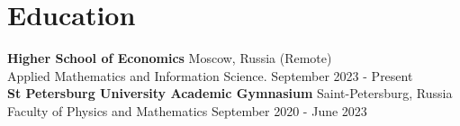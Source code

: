 \section{\sc Education}

\textbf{Higher School of Economics} \hfill Moscow, Russia (Remote) \\
Applied Mathematics and Information Science. \hfill September 2023 - Present \\

\textbf{St Petersburg University Academic Gymnasium} \hfill	Saint-Petersburg, Russia \\
Faculty of Physics and Mathematics \hfill September 2020 - June 2023

\endinput
